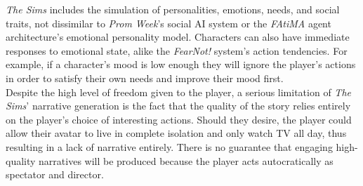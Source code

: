 \documentclass{sig-alternate-05-2015}
\begin{document}
\newline \textit{The Sims} includes the simulation of personalities, emotions, needs, and social traits, not dissimilar to \textit{Prom Week}'s social AI system or the \textit{FAtiMA} agent architecture's emotional personality model. Characters can also have immediate responses to emotional state, alike the \textit{FearNot!} system's action tendencies. For example, if a character's mood is low enough they will ignore the player's actions in order to satisfy their own needs and improve their mood first.\\

\newline Despite the high level of freedom given to the player, a serious limitation of \textit{The Sims}' narrative generation is the fact that the quality of the story relies entirely on the player's choice of interesting actions. Should they desire, the player could allow their avatar to live in complete isolation and only watch TV all day, thus resulting in a lack of narrative entirely. There is no guarantee that engaging high-quality narratives will be produced because the player acts autocratically as spectator and director.
\end{document}
